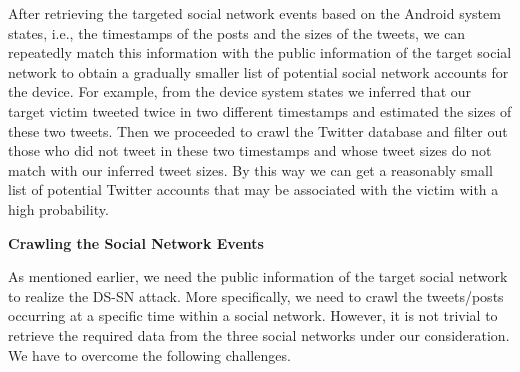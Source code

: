 \documentclass[letterpaper,12pt]{article}
\begin{document}
After retrieving the targeted social network events based on the Android system states, i.e., the timestamps of the posts and the sizes of the tweets, we can repeatedly match this information with the public information of the target social network to obtain a gradually smaller list of potential social network accounts for the device. For example, from the device system states we inferred that our target victim tweeted twice in two different timestamps and estimated the sizes of these two tweets. Then we proceeded to crawl the Twitter database and filter out those who did not tweet in these two timestamps and whose tweet sizes do not match with our inferred tweet sizes. By this way we can get a reasonably small list of potential Twitter accounts that may be associated with the victim with a high probability. %


\textbf{Crawling the Social Network Events}

As mentioned earlier, we need the public information of the target social network to realize the DS-SN attack. More specifically, we need to crawl the tweets/posts occurring at a specific time within a social network. However, it is not trivial to retrieve the required data from the three social networks under our consideration. We have to overcome the following challenges.
\end{document}
